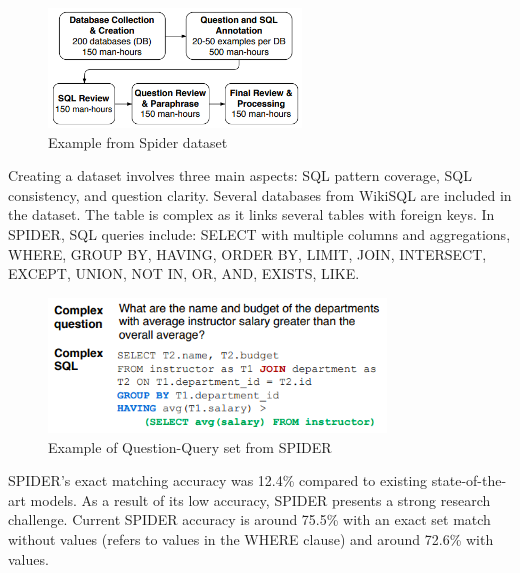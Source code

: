 \begin{figure}[htb]
    \centering
    \includegraphics[width=0.6\textwidth]{pics/db/Spider.png}
    \caption{Example from Spider dataset\cite{yu_spider_2019}}
    \label{fig:Spider}
\end{figure}

Creating a dataset involves three main aspects: SQL pattern coverage, SQL consistency, and question clarity. Several databases from WikiSQL are included in the dataset. The table is complex as it links several tables with foreign keys. In SPIDER, SQL queries include: SELECT with multiple columns and aggregations, WHERE, GROUP BY, HAVING, ORDER BY, LIMIT, JOIN, INTERSECT, EXCEPT, UNION, NOT IN, OR, AND, EXISTS, LIKE.

\begin{figure}[htb]
    \centering
    \includegraphics[width=0.8\textwidth]{pics/db/Spider2.png}
    \caption{Example of Question-Query set from SPIDER\cite{yu_spider_2019}}
    \label{fig:Spider2}
\end{figure}

SPIDER's exact matching accuracy was 12.4\% compared to existing state-of-the-art models. As a result of its low accuracy, SPIDER presents a strong research challenge. Current SPIDER accuracy is around 75.5\% with an exact set match without values (refers to values in the WHERE clause) and around 72.6\% with values.